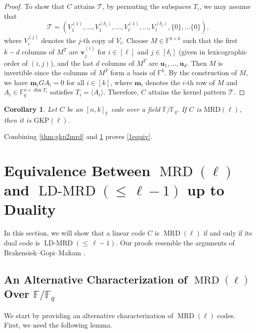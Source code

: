 \documentclass[11pt]{article}
\theoremstyle{plain}
\newtheorem{cor}[thm]{Corollary}
\theoremstyle{definition}
\theoremstyle{remark}
\newcommand{\ldmrd}[1]{\operatorname{LD-MRD}({\leq}\,#1)}
\newcommand{\F}{\mathbb{F}}
\newcommand{\bv}{\bm{v}}
\newcommand{\bu}{\bm{u}}
\newcommand{\vm}{\bm{m}}
\begin{document}
\begin{proof}
To show that $C$ attains $\mathcal{T}$, by permuting the subspaces $T_i$, we may assume that
\[
\mathcal{T}=\left(V_1^{(1)},\dots,V_1^{(\delta_1)},\dots,V_{\ell}^{(1)},\dots,V_{\ell}^{(\delta_{\ell})}, \{0\},\dots\{0\}\right),
\]
where $V_i^{(j)}$ denotes the $j$-th copy of $V_i$.
Choose $M \in \F^{k\times k}$ such that the first $k-d$ columns of $M^T$ are $\bv^{(i)}_j$ for $i\in [\ell]$ and $j\in [\delta_i]$ (given in lexicographic order of $(i,j)$), and the last $d$ columns of $M^T$ are $\bu_1,\dots,\bu_d$.
Then $M$ is invertible since the columns of $M^T$ form a basis of $\F^k$.
By the construction of $M$, we have $\vm_i GA_i=0$ for all $i\in [k]$, where $\vm_i$ denotes the $i$-th row of $M$ and $A_i\in \F_q^{n\times \dim T_i}$ satisfies $T_i=\langle A_i\rangle$. 
Therefore, $C$ attains the kernel pattern $\mathcal{T}$.
\end{proof}


\begin{cor}\label{cor:mrd2gkp}
Let $C$ be an $[n,k]_{\F}$ code over a field $\F/\F_q$.
If $C$ is $\mathrm{MRD}(\ell)$, then it is $\mathrm{GKP}(\ell)$.
\end{cor}

Combining \cref{thm:gkp2mrd} and \cref{cor:mrd2gkp} proves \cref{1equiv}.
\section{Equivalence Between $\operatorname{MRD}(\ell)$ and $\ldmrd{\ell-1}$ up to Duality}

In this section, we will show that a linear code $C$ is $\operatorname{MRD}(\ell)$ if and only if its dual code is $\ldmrd{\ell-1}$. Our proofs resemble the arguments of Brakensiek--Gopi--Makam \cite{brakensiek2023generic}. 

\subsection{An Alternative Characterization of $\operatorname{MRD}(\ell)$ Over $\F/\F_q$}

We start by providing an alternative characterization of $\operatorname{MRD}(\ell)$ codes. First, we need the following lemma.
\end{document}
